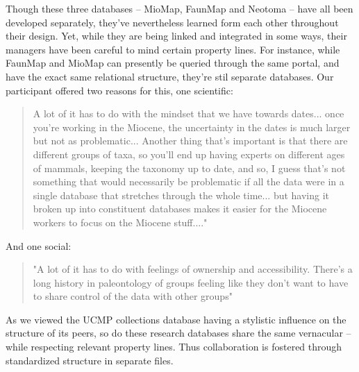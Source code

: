 Though these three databases -- MioMap, FaunMap and Neotoma -- have all been developed separately, they've nevertheless learned form each other throughout their design. Yet, while they are being linked and integrated in some ways, their managers have been careful to mind certain property lines.  For instance, while FaunMap and MioMap can presently be queried through the same portal, and have the exact same relational structure, they're stil separate databases.  Our participant offered two reasons for this, one scientific:
\begin{quote}
A lot of it has to do with the mindset that we have towards dates... once you're working in the Miocene, the uncertainty in the dates is much larger but not as problematic... Another thing that's important is that there are different groups of taxa, so you'll end up having experts on different ages of mammals, keeping the taxonomy up to date, and so, I guess that's not something that would necessarily be problematic if all the data were in a single database that stretches through the whole time... but having it broken up into constituent databases makes it easier for the Miocene workers to focus on the Miocene stuff...."
\end{quote}
And one social:
\begin{quote}
"A lot of it has to do with feelings of ownership and accessibility. There's a long history in paleontology of groups feeling like they don't want to have to share control of the data with other groups"
\end{quote}
As we viewed the UCMP collections database having a stylistic influence on the structure of its peers, so do these research databases share the same vernacular -- while respecting relevant property lines. Thus collaboration is fostered through standardized structure in separate files.

